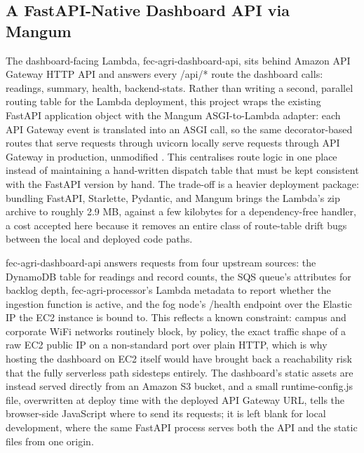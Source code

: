 \documentclass[conference]{IEEEtran}
\begin{document}
\subsection{A FastAPI-Native Dashboard API via Mangum}
The dashboard-facing Lambda, fec-agri-dashboard-api, sits behind Amazon API Gateway HTTP API and answers every /api/* route the dashboard calls: readings, summary, health, backend-stats. Rather than writing a second, parallel routing table for the Lambda deployment, this project wraps the existing FastAPI application object with the Mangum ASGI-to-Lambda adapter: each API Gateway event is translated into an ASGI call, so the same decorator-based routes that serve requests through uvicorn locally serve requests through API Gateway in production, unmodified \cite{ref9}. This centralises route logic in one place instead of maintaining a hand-written dispatch table that must be kept consistent with the FastAPI version by hand. The trade-off is a heavier deployment package: bundling FastAPI, Starlette, Pydantic, and Mangum brings the Lambda's zip archive to roughly 2.9 MB, against a few kilobytes for a dependency-free handler, a cost accepted here because it removes an entire class of route-table drift bugs between the local and deployed code paths.

fec-agri-dashboard-api answers requests from four upstream sources: the DynamoDB table for readings and record counts, the SQS queue's attributes for backlog depth, fec-agri-processor's Lambda metadata to report whether the ingestion function is active, and the fog node's /health endpoint over the Elastic IP the EC2 instance is bound to. This reflects a known constraint: campus and corporate WiFi networks routinely block, by policy, the exact traffic shape of a raw EC2 public IP on a non-standard port over plain HTTP, which is why hosting the dashboard on EC2 itself would have brought back a reachability risk that the fully serverless path sidesteps entirely. The dashboard's static assets are instead served directly from an Amazon S3 bucket, and a small runtime-config.js file, overwritten at deploy time with the deployed API Gateway URL, tells the browser-side JavaScript where to send its requests; it is left blank for local development, where the same FastAPI process serves both the API and the static files from one origin.
\end{document}
